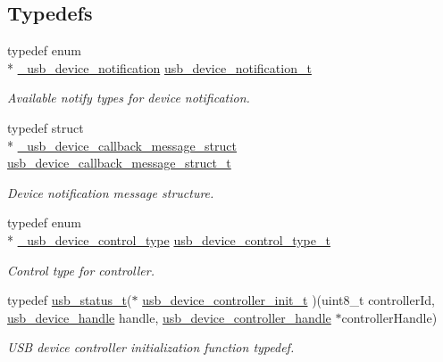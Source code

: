 \subsection*{Typedefs}
\begin{DoxyCompactItemize}
\item 
typedef enum \\*
\hyperlink{group__usb__device__controller__driver_gafdba1a6b57efd437d6a941bfbb9239db}{\-\_\-usb\-\_\-device\-\_\-notification} \hyperlink{group__usb__device__controller__driver_gabb134b8f1a6b63ae3979523ba53480bc}{usb\-\_\-device\-\_\-notification\-\_\-t}
\begin{DoxyCompactList}\small\item\em Available notify types for device notification. \end{DoxyCompactList}\item 
typedef struct \\*
\hyperlink{struct__usb__device__callback__message__struct}{\-\_\-usb\-\_\-device\-\_\-callback\-\_\-message\-\_\-struct} \hyperlink{group__usb__device__controller__driver_ga85f9edb535af10a4a706061b9f06bc25}{usb\-\_\-device\-\_\-callback\-\_\-message\-\_\-struct\-\_\-t}
\begin{DoxyCompactList}\small\item\em Device notification message structure. \end{DoxyCompactList}\item 
typedef enum \\*
\hyperlink{group__usb__device__controller__driver_gaa7a58da69289c9e774119a7998835c54}{\-\_\-usb\-\_\-device\-\_\-control\-\_\-type} \hyperlink{group__usb__device__controller__driver_gae16dc18943ae9da34a2b122859568b5e}{usb\-\_\-device\-\_\-control\-\_\-type\-\_\-t}
\begin{DoxyCompactList}\small\item\em Control type for controller. \end{DoxyCompactList}\item 
typedef \hyperlink{group__usb__drv_ga3172b9f50553fb6d8aa2823d10a39c58}{usb\-\_\-status\-\_\-t}($\ast$ \hyperlink{group__usb__device__controller__driver_ga7f8af48e2f4f886f521f8128b6a05e9b}{usb\-\_\-device\-\_\-controller\-\_\-init\-\_\-t} )(uint8\-\_\-t controller\-Id, \hyperlink{group__usb__drv_gae62132dc6e5eba994f8aa56cb7399abc}{usb\-\_\-device\-\_\-handle} handle, \hyperlink{group__usb__device__controller__driver_gaec03ce2e4732aa876cd2a91cf8e93b5b}{usb\-\_\-device\-\_\-controller\-\_\-handle} $\ast$controller\-Handle)
\begin{DoxyCompactList}\small\item\em U\-S\-B device controller initialization function typedef. \end{DoxyCompactList}\item 

\end{DoxyCompactItemize}

